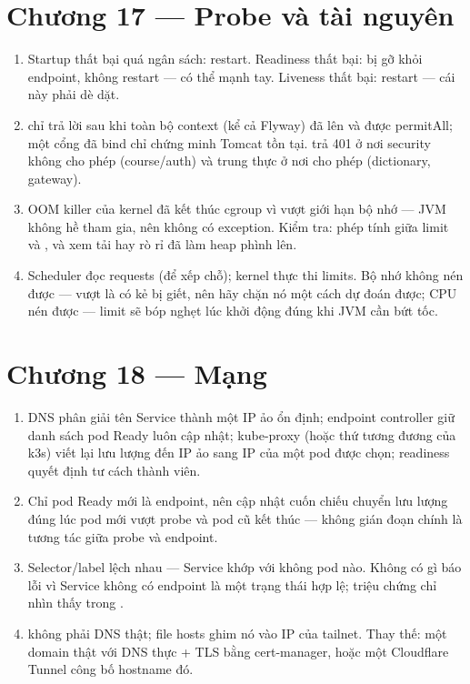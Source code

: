 \section*{Chương 17 --- Probe và tài nguyên}
\begin{enumerate}
  \item Startup thất bại quá ngân sách: restart. Readiness thất bại: bị
  gỡ khỏi endpoint, không restart --- có thể mạnh tay. Liveness thất
  bại: restart --- cái này phải dè dặt.
  \item {} chỉ trả lời sau khi toàn bộ context (kể cả
  Flyway) đã lên và được permitAll; một cổng đã bind chỉ chứng minh
  Tomcat tồn tại.  trả 401 ở nơi security không
  cho phép (course/auth) và trung thực ở nơi cho phép (dictionary,
  gateway).
  \item OOM killer của kernel đã kết thúc cgroup vì vượt giới hạn bộ
  nhớ --- JVM không hề tham gia, nên không có exception. Kiểm tra:
  phép tính giữa limit và , và xem tải hay rò
  rỉ đã làm heap phình lên.
  \item Scheduler đọc requests (để xếp chỗ); kernel thực thi limits. Bộ
  nhớ không nén được --- vượt là có kẻ bị giết, nên hãy chặn nó một
  cách dự đoán được; CPU nén được --- limit sẽ bóp nghẹt lúc khởi động
  đúng khi JVM cần bứt tốc.
\end{enumerate}

\section*{Chương 18 --- Mạng}
\begin{enumerate}
  \item DNS phân giải tên Service thành một IP ảo ổn định; endpoint
  controller giữ danh sách pod Ready luôn cập nhật; kube-proxy (hoặc
  thứ tương đương của k3s) viết lại lưu lượng đến IP ảo sang IP của
  một pod được chọn; readiness quyết định tư cách thành viên.
  \item Chỉ pod Ready mới là endpoint, nên cập nhật cuốn chiếu chuyển
  lưu lượng đúng lúc pod mới vượt probe và pod cũ kết thúc --- không
  gián đoạn chính là tương tác giữa probe và endpoint.
  \item Selector/label lệch nhau --- Service khớp với không pod nào.
  Không có gì báo lỗi vì Service không có endpoint là một trạng thái
  hợp lệ; triệu chứng chỉ nhìn thấy trong .
  \item {} không phải DNS thật; file hosts ghim nó vào IP
  của tailnet. Thay thế: một domain thật với DNS thực + TLS bằng
  cert-manager, hoặc một Cloudflare Tunnel công bố hostname đó.
\end{enumerate}

